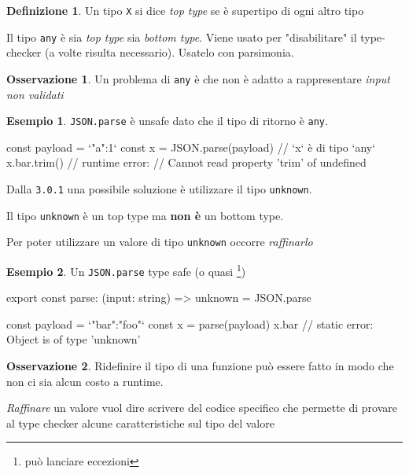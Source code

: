 \documentclass[12pt]{article}
\theoremstyle{definition}
\newtheorem{definition}{Definizione}[section]
\newtheorem{example}{Esempio}[subsection]
\newtheorem{observation}{Osservazione}[subsection]
\newenvironment{code}
  {\vspace{0.5cm} \VerbatimEnvironment\begin{typescriptcode}}
  {\end{typescriptcode} \vspace{0.2cm}}
\begin{document}
\begin{definition}
Un tipo \texttt{X} si dice \emph{top type} se è supertipo di ogni altro tipo
\end{definition}

Il tipo \texttt{any} è sia \emph{top type} sia \emph{bottom type}.
Viene usato per "disabilitare" il type-checker (a volte risulta necessario).
Usatelo con parsimonia.

\begin{observation}
Un problema di \texttt{any} è che non è adatto a rappresentare \emph{input non validati}
\end{observation}

\begin{example}
\texttt{JSON.parse} è unsafe dato che il tipo di ritorno è \texttt{any}.

\begin{code}
const payload = `{"a":1}`
const x = JSON.parse(payload)
// `x` è di tipo `any`
x.bar.trim() // runtime error:
// Cannot read property 'trim' of undefined
\end{code}
\end{example}

Dalla \texttt{3.0.1} una possibile soluzione è utilizzare il tipo \texttt{unknown}.

Il tipo \texttt{unknown} è un top type ma \textbf{non è} un bottom type.

Per poter utilizzare un valore di tipo \texttt{unknown} occorre \emph{raffinarlo}

\begin{example}
Un \texttt{JSON.parse} type safe (o quasi \footnote{può lanciare eccezioni})

\begin{code}
export const parse: (input: string) => unknown = JSON.parse

const payload = `{"bar":"foo"}`
const x = parse(payload)
x.bar // static error: Object is of type 'unknown'
\end{code}
\end{example}

\begin{observation}
Ridefinire il tipo di una funzione può essere fatto in modo che non ci sia alcun costo a runtime.
\end{observation}

\emph{Raffinare} un valore vuol dire scrivere del codice specifico che permette di provare al type checker
alcune caratteristiche sul tipo del valore
\end{document}
